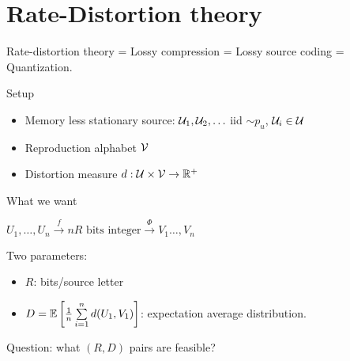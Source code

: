\chapter{Rate-Distortion theory}

Rate-distortion theory = Lossy compression = Lossy source coding = Quantization.

Setup
\begin{itemize}
    \item Memory less stationary source: $\mathcal{U}_1,\mathcal{U}_2,\ldots$ iid $\sim p_u$, $\mathcal{U}_i \in \mathcal{U}$
    \item Reproduction alphabet $\mathcal{V}$
    \item Distortion measure $d:\mathcal{U}\times\mathcal{V} \to \mathbb{R}^+$
\end{itemize}

What we want

$U_1,\ldots,U_n \overset{f}{\to} nR \text{ bits integer} \overset{\Phi}{\to} V_1\ldots,V_n$

Two parameters:
\begin{itemize}
    \item $R$: bits/source letter
    \item $D = \mathbb{E}\left[ \frac{1}{n} \sum\limits_{i=1}^n d(U_1, V_1)  \right]$: expectation average distribution.
\end{itemize}

Question: what $(R,D)$ pairs are feasible?

